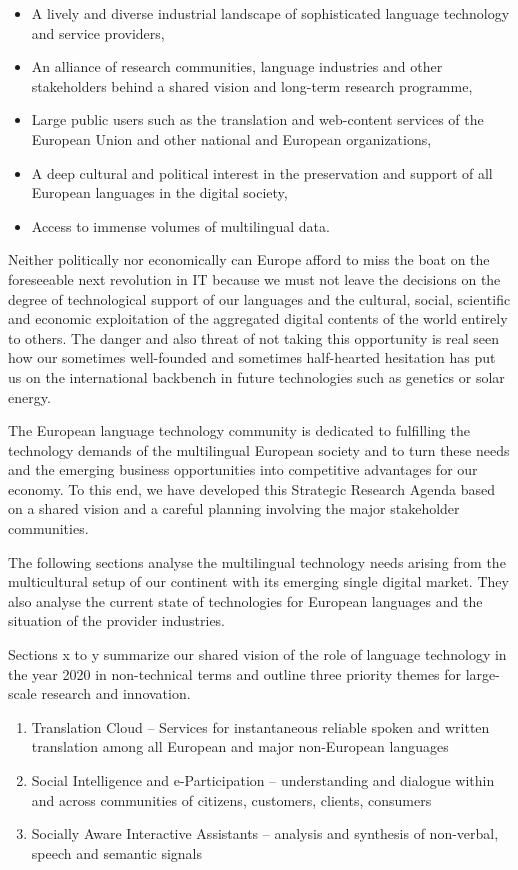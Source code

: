 \begin{multicols}{2}
\begin{itemize}
\item A lively and diverse industrial landscape of sophisticated language technology and service providers,
\item An alliance of research communities, language industries and other stakeholders behind a shared vision and long-term research programme,
\item Large public users such as the translation and web-content services of the European Union and other national and European organizations,
\item A deep cultural and political interest in the preservation and support of all European languages in the digital society,
\item Access to immense volumes of multilingual data.
\end{itemize}

Neither politically nor economically can Europe afford to miss the boat on the foreseeable next revolution in IT because we must not leave the decisions on the degree of technological support of our languages and the cultural, social, scientific and economic exploitation of the aggregated digital contents of the world entirely to others. The danger and also threat of not taking this opportunity is real seen how our sometimes well-founded and sometimes half-hearted hesitation has put us on the international backbench in future technologies such as genetics or solar energy.

The European language technology community is dedicated to fulfilling the technology demands of the multilingual European society and to turn these needs and the emerging business opportunities into competitive advantages for our economy. To this end, we have developed this Strategic Research Agenda based on a shared vision and a careful planning involving the major stakeholder communities.

The following sections analyse the multilingual technology needs arising from the multicultural setup of our continent with its emerging single digital market. They also analyse the current state of technologies for European languages and the situation of the provider industries. 

Sections x to y summarize our shared vision of the role of language technology in the year 2020 in non-technical terms and outline three priority themes for large-scale research and innovation. 

\begin{enumerate}
\item Translation Cloud – Services for instantaneous reliable spoken and written translation among all European and major non-European languages
\item Social Intelligence and e-Participation – understanding and dialogue within and across communities of citizens, customers, clients, consumers
\item Socially Aware Interactive Assistants – analysis and synthesis of non-verbal, speech and semantic signals
\end{enumerate}
 

\end{multicols}
